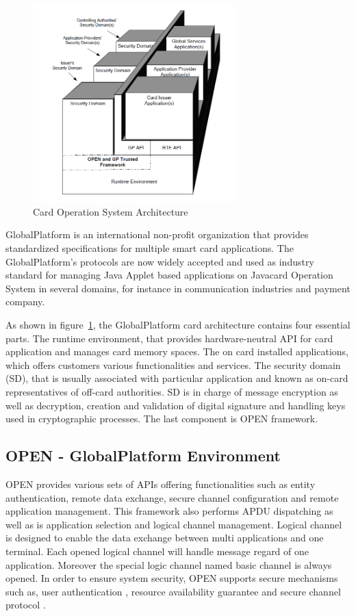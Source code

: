 \begin{figure}[!htbp]
	\centering
	\includegraphics[width=0.7\textwidth]{gp_1.jpg}
		\caption{Card Operation System Architecture\cite{gp}}
	\label{fig:gp_1}
\end{figure}
GlobalPlatform is an international non-profit organization that provides standardized specifications for multiple smart card applications. The  GlobalPlatform's protocols are now widely accepted and used as industry standard for managing Java Applet based applications on Javacard Operation System in several domains, for instance in communication industries and payment company\cite{gp}. 

As shown in figure~\ref{fig:gp_1},  the GlobalPlatform card architecture contains four essential parts. The runtime environment, that provides hardware-neutral API for card application  and manages card memory spaces. The on card installed applications, which offers customers various functionalities and services. The security domain (SD), that is usually associated with particular application and known as on-card representatives  of off-card  authorities. SD is in charge of message encryption as well as decryption, creation and validation of digital signature and handling keys used in cryptographic processes. The last component is OPEN framework\cite{gp}.

\subsection{OPEN - GlobalPlatform Environment}
OPEN provides various sets of APIs offering functionalities such as entity authentication, remote data exchange, secure channel configuration and remote application management. This framework also performs APDU dispatching as well as is application selection and logical channel management\cite{gp}. Logical channel is designed to enable the data exchange between multi applications and one terminal. Each opened logical channel will handle message regard of one application.  Moreover the special logic channel named basic channel is always opened. In order to ensure system security, OPEN supports secure mechanisms such as,  user authentication , resource availability guarantee and secure channel protocol .
